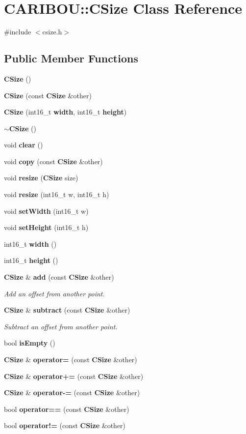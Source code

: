 \section{C\+A\+R\+I\+B\+OU\+:\+:C\+Size Class Reference}
\label{class_c_a_r_i_b_o_u_1_1_c_size}


{\ttfamily \#include $<$csize.\+h$>$}

\subsection*{Public Member Functions}
\begin{DoxyCompactItemize}
\item 
{\bf C\+Size} ()
\item 
{\bf C\+Size} (const {\bf C\+Size} \&other)
\item 
{\bf C\+Size} (int16\+\_\+t {\bf width}, int16\+\_\+t {\bf height})
\item 
{\bf $\sim$\+C\+Size} ()
\item 
void {\bf clear} ()
\item 
void {\bf copy} (const {\bf C\+Size} \&other)
\item 
void {\bf resize} ({\bf C\+Size} size)
\item 
void {\bf resize} (int16\+\_\+t w, int16\+\_\+t h)
\item 
void {\bf set\+Width} (int16\+\_\+t w)
\item 
void {\bf set\+Height} (int16\+\_\+t h)
\item 
int16\+\_\+t {\bf width} ()
\item 
int16\+\_\+t {\bf height} ()
\item 
{\bf C\+Size} \& {\bf add} (const {\bf C\+Size} \&other)
\begin{DoxyCompactList}\small\item\em Add an offset from another point. \end{DoxyCompactList}\item 
{\bf C\+Size} \& {\bf subtract} (const {\bf C\+Size} \&other)
\begin{DoxyCompactList}\small\item\em Subtract an offset from another point. \end{DoxyCompactList}\item 
bool {\bf is\+Empty} ()
\item 
{\bf C\+Size} \& {\bf operator=} (const {\bf C\+Size} \&other)
\item 
{\bf C\+Size} \& {\bf operator+=} (const {\bf C\+Size} \&other)
\item 
{\bf C\+Size} \& {\bf operator-\/=} (const {\bf C\+Size} \&other)
\item 
bool {\bf operator==} (const {\bf C\+Size} \&other)
\item 
bool {\bf operator!=} (const {\bf C\+Size} \&other)
\end{DoxyCompactItemize}


